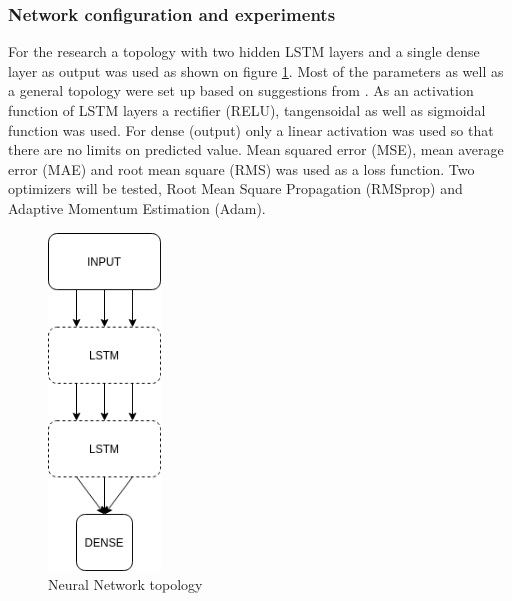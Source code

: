 \subsubsection{Network configuration and experiments}
For the research a topology with two hidden LSTM layers and a single dense layer as output was 
used as shown on figure \ref{fig:topology}.
Most of the parameters as well as a general topology were set up based on suggestions from 
\cite{Chollet2018}. As an activation function of LSTM layers a rectifier (RELU),
tangensoidal as well as sigmoidal function was used.
For dense (output) only a linear activation was used so that there are no limits on predicted 
value.
Mean squared error (MSE), mean average error (MAE) and root mean square (RMS)
was used as a loss function.
Two optimizers will be tested, Root Mean Square Propagation (RMSprop)\cite{Hinton2012} and 
Adaptive Momentum Estimation (Adam)\cite{Kingma2015}.
\begin{figure}[ht] 
	\centering
	\includegraphics[width=3cm]{figures/topology}
	\caption{Neural Network topology}
	\label{fig:topology}
\end{figure}

